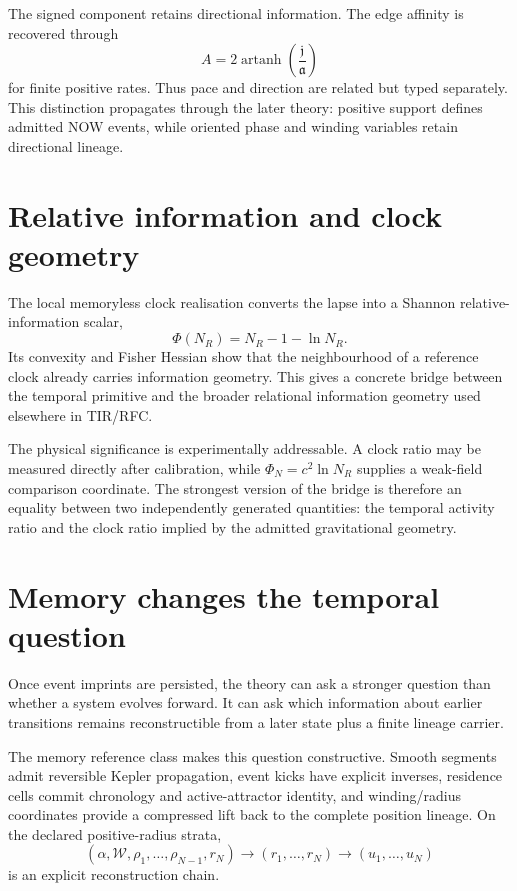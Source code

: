 \documentclass[11pt]{book}
\begin{document}
The signed component retains directional information. The edge affinity is recovered through
\[
A=2\operatorname{artanh}\left(\frac{\mathfrak j}{\mathfrak a}\right)
\]
for finite positive rates. Thus pace and direction are related but typed separately. This distinction propagates through the later theory: positive support defines admitted NOW events, while oriented phase and winding variables retain directional lineage.

\section{Relative information and clock geometry}

The local memoryless clock realisation converts the lapse into a Shannon relative-information scalar,
\[
\Phi(N_R)=N_R-1-\ln N_R.
\]
Its convexity and Fisher Hessian show that the neighbourhood of a reference clock already carries information geometry. This gives a concrete bridge between the temporal primitive and the broader relational information geometry used elsewhere in TIR/RFC.

The physical significance is experimentally addressable. A clock ratio may be measured directly after calibration, while \(\Phi_N=c^2\ln N_R\) supplies a weak-field comparison coordinate. The strongest version of the bridge is therefore an equality between two independently generated quantities: the temporal activity ratio and the clock ratio implied by the admitted gravitational geometry.

\section{Memory changes the temporal question}

Once event imprints are persisted, the theory can ask a stronger question than whether a system evolves forward. It can ask which information about earlier transitions remains reconstructible from a later state plus a finite lineage carrier.

The memory reference class makes this question constructive. Smooth segments admit reversible Kepler propagation, event kicks have explicit inverses, residence cells commit chronology and active-attractor identity, and winding/radius coordinates provide a compressed lift back to the complete position lineage. On the declared positive-radius strata,
\[
(\alpha,\mathcal W,\rho_1,\ldots,\rho_{N-1},r_N)
\longrightarrow
(r_1,\ldots,r_N)
\longrightarrow
(u_1,\ldots,u_N)
\]
is an explicit reconstruction chain.
\end{document}
